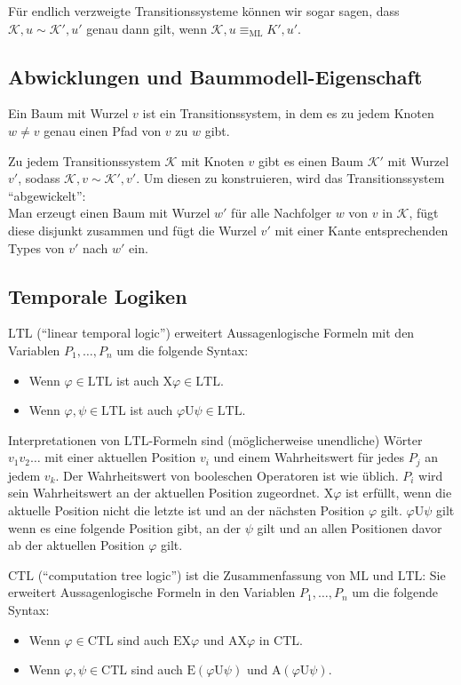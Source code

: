 \documentclass[a4paper,parskip=half*,DIV=15,fontsize=11pt]{scrartcl}
\newcommand{\K}{\mathcal{K}}
\newcommand{\ML}{\mathrm{ML}}
\newcommand{\LTL}{\mathrm{LTL}}
\newcommand{\CTL}{\mathrm{CTL}}
\newcommand{\X}{\mathrm{X}}
\newcommand{\until}{\mathrm{U}}
\begin{document}
Für endlich verzweigte Transitionssysteme können wir sogar sagen, dass $\K, u \sim \K', u'$ genau dann gilt, wenn $\K, u \equiv_\ML K', u'$.

\subsection{Abwicklungen und Baummodell-Eigenschaft}

Ein Baum mit Wurzel $v$ ist ein Transitionssystem, in dem es zu jedem Knoten $w \ne v$ genau einen Pfad von $v$ zu $w$ gibt.

Zu jedem Transitionssystem $\K$ mit Knoten $v$ gibt es einen Baum $\K'$ mit Wurzel $v'$, sodass $\K, v \sim \K', v'$. Um diesen zu konstruieren, wird das Transitionssystem ``abgewickelt'':    \\
Man erzeugt einen Baum mit Wurzel $w'$ für alle Nachfolger $w$ von $v$ in $\K$, fügt diese disjunkt zusammen und fügt die Wurzel $v'$ mit einer Kante entsprechenden Types von $v'$ nach $w'$ ein.

\subsection{Temporale Logiken}

$\LTL$ (``linear temporal logic'') erweitert Aussagenlogische Formeln mit den Variablen $P_1,\ldots,P_n$ um die folgende Syntax:
\begin{itemize}
\item Wenn $\varphi \in \LTL$ ist auch $\X\varphi \in \LTL$.
\item Wenn $\varphi, \psi \in \LTL$ ist auch $\varphi \until \psi \in \LTL$.
\end{itemize}

Interpretationen von $\LTL$-Formeln sind (möglicherweise unendliche) Wörter $v_1v_2\ldots$ mit einer aktuellen Position $v_i$ und einem Wahrheitswert für jedes $P_j$ an jedem $v_k$. Der Wahrheitswert von booleschen Operatoren ist wie üblich. $P_i$ wird sein Wahrheitswert an der aktuellen Position zugeordnet. $\X\varphi$ ist erfüllt, wenn die aktuelle Position nicht die letzte ist und an der nächsten Position $\varphi$ gilt. $\varphi\until\psi$ gilt wenn es eine folgende Position gibt, an der $\psi$ gilt und an allen Positionen davor ab der aktuellen Position $\varphi$ gilt.

$\CTL$ (``computation tree logic'') ist die Zusammenfassung von $\ML$ und $\LTL$: Sie erweitert Aussagenlogische Formeln in den Variablen $P_1,\ldots,P_n$ um die folgende Syntax:
\begin{itemize}
\item Wenn $\varphi \in \CTL$ sind auch $\mathrm{E}\X\varphi$ und $\mathrm{A}\X\varphi$ in $\CTL$.
\item Wenn $\varphi, \psi \in \CTL$ sind auch $\mathrm{E}(\varphi \until \psi)$ und $\mathrm{A}(\varphi\until\psi)$.
\end{itemize}
\end{document}
